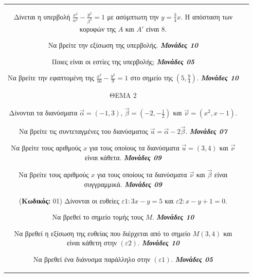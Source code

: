 \documentclass[11pt,a4paper,twoside]{book}
\newcounter{askhsh}[chapter]
\renewcommand{\theaskhsh}{
	\bf{\titlefont{\Large{\thechapter}}.\arabic{askhsh}}
}
\newcommand{\Askhsh}[2]{\refstepcounter{askhsh}{\vspace{4mm}\titlefont{{\large Άσκηση}\theaskhsh} - \textcolor{maincolor}{ΘEMA #2}} ({\small{\textbf{Κωδικός:} #1}})}{}
\newcommand{\monades}[1]{
\hspace*{\fill}
\textbf{\textit{\textcolor{maincolor}{Μονάδες #1}}}}
\begin{document}
\begin{tabular}{cc}
Δίνεται η υπερβολή $\frac{x^2}{\alpha^2} - \frac{y^2}{\beta^2} = 1$ με ασύμπτωτη την $y = \frac{3}{4} x$. Η απόσταση των κορυφών της $A$ και $A'$ είναι $8$.

\begin{alist}    \item 
    \begin{rlist}
        \item Να βρείτε την εξίσωση της υπερβολής. \monades{10}
        \item Ποιες είναι οι εστίες της υπερβολής; \monades{05}
    \end{rlist}
    \item Να βρείτε την εφαπτομένη της $\frac{x^2}{16} - \frac{y^2}{9} = 1$ στο σημείο της $\left(5, \frac{9}{4}\right)$. \monades{10}\end{alist}

\vspace{4mm}

ΘΕΜΑ 2

Δίνονται τα διανύσματα $\vec{\alpha} = (-1,3)$, $\vec{\beta} = \left(-2, -\frac{1}{2}\right)$ και $\vec{\nu} = (x^2, x-1)$.

\begin{alist}    \item Να βρείτε τις συντεταγμένες του διανύσματος $\vec{u} = \vec{\alpha} - 2\vec{\beta}$. \monades{07}
    \item Να βρείτε τους αριθμούς $x$ για τους οποίους τα διανύσματα $\vec{u} = (3,4)$ και $\vec{\nu}$ είναι κάθετα. \monades{09}
    \item Να βρείτε τους αριθμούς $x$ για τους οποίους τα διανύσματα $\vec{\nu}$ και $\vec{\beta}$ είναι συγγραμμικά. \monades{09}\end{alist}

\vspace{4mm}

\Askhsh{01}{2}
Δίνονται οι ευθείες $\varepsilon1: 3x - y = 5$ και $\varepsilon2: x - y + 1 = 0$.
\begin{alist}    \item Να βρεθεί το σημείο τομής τους $M$. \monades{10}
    \item Να βρεθεί η εξίσωση της ευθείας που διέρχεται από το σημείο $M(3,4)$ και είναι κάθετη στην $(\varepsilon2)$. \monades{10}
    \item Να βρεθεί ένα διάνυσμα παράλληλο στην $(\varepsilon1)$. \monades{05}\end{alist}


\end{tabular}
\end{document}
